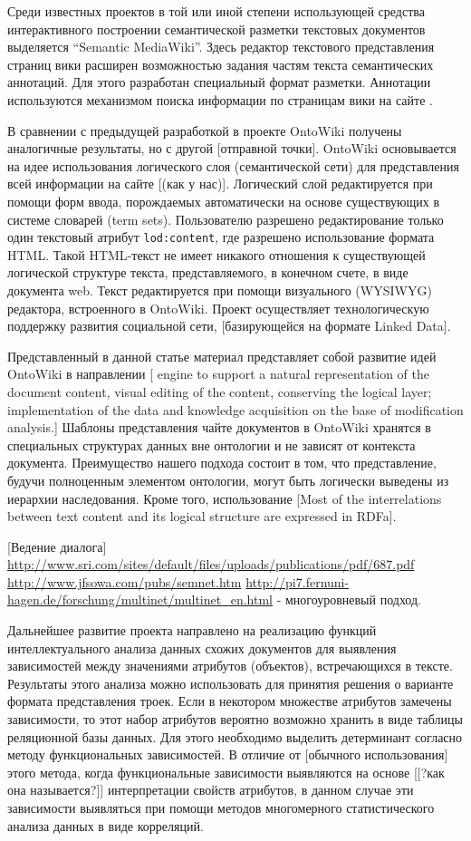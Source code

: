 \documentclass[utf8]{../IncArticle}
\newcommand{\e}[2][fcolor]{\textcolor{pcolor}{[}\textcolor{#1}{#2}\textcolor{pcolor}{]}}
\begin{document}
Среди известных проектов в той или иной степени использующей средства
интерактивного построении семантической разметки текстовых документов
выделяется “Semantic MediaWiki”.  Здесь редактор текстового
представления страниц вики расширен возможностью задания частям текста
семантических аннотаций.  Для этого разработан специальный формат
разметки.  Аннотации используются механизмом поиска информации по
страницам вики на сайте \cite{b1:13}.

В сравнении с предыдущей разработкой в проекте OntoWiki \cite{b:2:14}
получены аналогичные результаты, но с другой \e{отправной точки}.
OntoWiki основывается на идее использования логического слоя
(семантической сети) для представления всей информации на сайте
\e{(как у нас)}.  Логический слой редактируется при помощи форм ввода,
порождаемых автоматически на основе существующих в системе словарей
(term sets).  Пользователю разрешено редактирование только один
текстовый атрибут \texttt{lod:content}, где разрешено использование
формата HTML.  Такой HTML-текст не имеет никакого отношения к
существующей логической структуре текста, представляемого, в конечном
счете, в виде документа web.   Текст редактируется при помощи
визуального (WYSIWYG) редактора, встроенного в OntoWiki.  Проект
осуществляет технологическую поддержку развития социальной сети,
\e{базирующейся на формате Linked Data}.

Представленный в данной статье материал представляет собой развитие
идей OntoWiki в направлении \e{
engine to support a natural representation of the document content,
visual editing of the content, conserving the logical layer;
implementation of the data and knowledge acquisition on the base of
modification analysis.}  Шаблоны представления чайте документов в
OntoWiki хранятся в специальных структурах данных вне онтологии и не
зависят от контекста документа.  Преимущество нашего подхода состоит в
том, что представление, будучи полноценным элементом онтологии, могут
быть логически выведены из иерархии наследования.  Кроме того,
использование \e{Most of the
interrelations between text content and its logical structure are
expressed in RDFa}.

\e{Ведение диалога}
\url{http://www.sri.com/sites/default/files/uploads/publications/pdf/687.pdf}
\url{http://www.jfsowa.com/pubs/semnet.htm}
\url{http://pi7.fernuni-hagen.de/forschung/multinet/multinet_en.html}
- многоуровневый подход.


Дальнейшее развитие проекта направлено на реализацию функций
интеллектуального анализа данных схожих документов для выявления
зависимостей между значениями атрибутов (объектов), встречающихся в
тексте.  Результаты этого анализа можно использовать для принятия
решения о варианте формата представления троек.  Если в некотором
множестве атрибутов замечены зависимости, то этот набор атрибутов
вероятно возможно хранить в виде таблицы реляционной базы данных.  Для
этого необходимо выделить детерминант согласно методу функциональных
зависимостей.  В отличие от \e{обычного использования} этого метода,
когда функциональные зависимости выявляются на основе \e{[?как она
  называется?]} интерпретации свойств атрибутов, в данном случае эти
зависимости выявляться при помощи методов многомерного статистического
анализа данных в виде корреляций.
\end{document}

